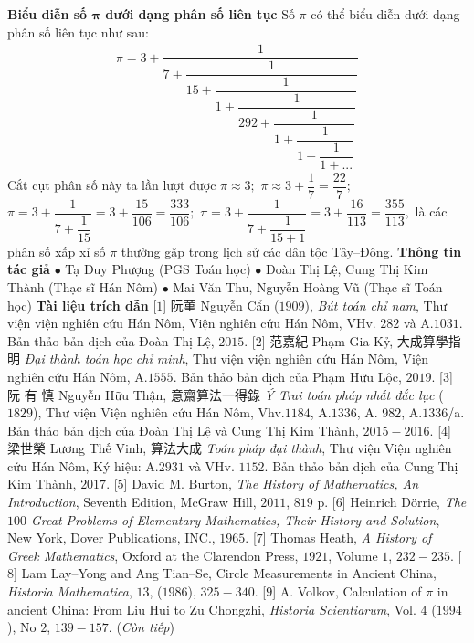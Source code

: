 \begin{multicols}{2}
	\vskip 0.1cm 
	\textbf{\color{lichsutoanhoc}Biểu diễn số $\pmb{\pi}$  dưới dạng phân số liên tục}
	\vskip 0.1cm
	Số $\pi$  có thể biểu diễn dưới dạng phân số liên tục như sau: 
	\begin{align*}
		\pi  \!=\! 3 \!+\! \dfrac{1}{{7 \!+\! \dfrac{1}{{15 \!+\! \dfrac{1}{{1 \!+\! \dfrac{1}{{292 \!+\! \dfrac{1}{{1 \!+\! \dfrac{1}{{1 \!+\! \dfrac{1}{{1 \!+\! ...}}}}}}}}}}}}}}
	\end{align*}
	Cắt cụt phân số này ta lần lượt được  $\pi  \approx 3;$  $\pi  \approx 3 + \dfrac{1}{7} = \dfrac{{22}}{7};$ $\pi  = 3 + \dfrac{1}{{7 + \dfrac{1}{{15}}}} = 3 + \dfrac{{15}}{{106}} = \dfrac{{333}}{{106}};$ $\pi  = 3 + \dfrac{1}{{7 + \dfrac{1}{{15 + 1}}}} = 3 + \dfrac{{16}}{{113}} = \dfrac{{355}}{{113}},$
	là các phân số xấp xỉ số $\pi$ thường gặp trong lịch sử các dân tộc Tây--Đông.
	\vskip 0.1cm
	\textbf{\color{lichsutoanhoc}Thông tin tác giả}
	\vskip 0.1cm
	$\bullet$ Tạ Duy Phượng (PGS Toán học)
	\vskip 0.1cm
	$\bullet$ Đoàn Thị Lệ, Cung Thị Kim Thành (Thạc sĩ Hán Nôm)
	\vskip 0.1cm
	$\bullet$ Mai Văn Thu, Nguyễn Hoàng Vũ (Thạc sĩ Toán học)
	\vskip 0.1cm
	\textbf{\color{lichsutoanhoc}Tài liệu trích dẫn}
	\vskip 0.1cm
	[$1$]   阮菫 Nguyễn Cẩn ($1909$),  \textit{Bút toán chỉ nam}, Thư viện viện nghiên cứu Hán Nôm, Viện nghiên cứu Hán Nôm, VHv. $282$ và A.$1031$. Bản thảo bản dịch của Đoàn Thị Lệ, $2015$.
	\vskip 0.1cm
	[$2$] 范嘉紀  Phạm Gia Kỷ,  大成算學指明  \textit{Đại thành toán học chỉ minh}, Thư viện viện nghiên cứu Hán Nôm, Viện nghiên cứu Hán Nôm, A.$1555$. Bản thảo bản dịch của Phạm Hữu Lộc, $2019$.
	\vskip 0.1cm 
	[$3$]  阮 有 慎 Nguyễn Hữu Thận,  意齋算法一得錄  \textit{Ý Trai toán pháp nhất đắc lục} ($1829$), Thư viện Viện nghiên cứu Hán Nôm, Vhv.$1184$, A.$1336$, A. $982$, A.$1336$/a. Bản thảo bản dịch của Đoàn Thị Lệ và Cung Thị Kim Thành, $2015-2016$.
	\vskip 0.1cm 
	[$4$] 梁世榮  Lương Thế Vinh,  算法大成 \textit{Toán pháp đại thành}, Thư viện Viện nghiên cứu Hán Nôm, Ký hiệu: A.$2931$ và VHv. $1152$. Bản thảo bản dịch của Cung Thị Kim Thành, $2017$.
	\vskip 0.1cm
	[$5$] David M. Burton, \textit{The History of Mathematics, An Introduction}, Seventh Edition, McGraw Hill, $2011$, $819$ p.
	\vskip 0.1cm
	[$6$] Heinrich Dörrie, \textit{The $100$ Great Problems of Elementary Mathematics, Their History and Solution}, New York, Dover Publications, INC., $1965$.
	\vskip 0.1cm     
	[$7$] Thomas Heath, \textit{A History of Greek Mathematics}, Oxford at the Clarendon Press, $1921$, Volume $1$, $232-235$.
	\vskip 0.1cm
	[$8$] Lam Lay--Yong and Ang Tian--Se, Circle Measurements in Ancient China, \textit{Historia Mathematica}, $13$,  ($1986$), $325-340$.
	\vskip 0.1cm
	[$9$] A. Volkov, Calculation of $\pi$ in ancient China: From Liu Hui to Zu Chongzhi, \textit{Historia Scientiarum}, Vol. $4$ ($1994$), No $2$, $139-157$. 
	\vskip 0.1cm
	\hfill (\textit{Còn tiếp})
\end{multicols}